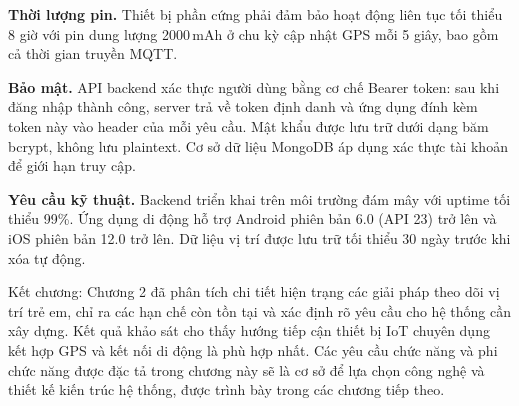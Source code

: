 \documentclass[../DoAn.tex]{subfiles}
\begin{document}
\textbf{Thời lượng pin.} Thiết bị phần cứng phải đảm bảo hoạt động liên tục tối thiểu 8 giờ với pin dung lượng 2000\,mAh ở chu kỳ cập nhật GPS mỗi 5 giây, bao gồm cả thời gian truyền MQTT.

\textbf{Bảo mật.} API backend xác thực người dùng bằng cơ chế Bearer token: sau khi đăng nhập thành công, server trả về token định danh và ứng dụng đính kèm token này vào header của mỗi yêu cầu. Mật khẩu được lưu trữ dưới dạng băm bcrypt, không lưu plaintext. Cơ sở dữ liệu MongoDB áp dụng xác thực tài khoản để giới hạn truy cập.

\textbf{Yêu cầu kỹ thuật.} Backend triển khai trên môi trường đám mây với uptime tối thiểu 99\%. Ứng dụng di động hỗ trợ Android phiên bản 6.0 (API 23) trở lên và iOS phiên bản 12.0 trở lên. Dữ liệu vị trí được lưu trữ tối thiểu 30 ngày trước khi xóa tự động.

Kết chương: Chương 2 đã phân tích chi tiết hiện trạng các giải pháp theo dõi vị trí trẻ em, chỉ ra các hạn chế còn tồn tại và xác định rõ yêu cầu cho hệ thống cần xây dựng. Kết quả khảo sát cho thấy hướng tiếp cận thiết bị IoT chuyên dụng kết hợp GPS và kết nối di động là phù hợp nhất. Các yêu cầu chức năng và phi chức năng được đặc tả trong chương này sẽ là cơ sở để lựa chọn công nghệ và thiết kế kiến trúc hệ thống, được trình bày trong các chương tiếp theo.
\end{document}

